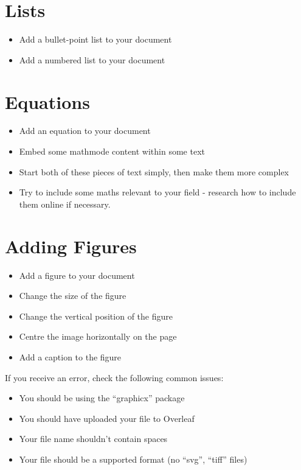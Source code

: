 \documentclass[11pt,a4paper]{article}
\begin{document}
\section{Lists}
\begin{itemize}
\item Add a bullet-point list to your document
\item Add a numbered list to your document
\end{itemize}

\section{Equations}
\begin{itemize}
\item Add an equation to your document
\item Embed some mathmode content within some text
\item Start both of these pieces of text simply, then make them more complex
\item Try to include some maths relevant to your field - research how to include them online if necessary.
\end{itemize}

\section{Adding Figures}
\begin{itemize}
\item Add a figure to your document
\item Change the size of the figure
\item Change the vertical position of the figure
\item Centre the image horizontally on the page
\item Add a caption to the figure
\end{itemize}

If you receive an error, check the following common issues:

\begin{itemize}
\item You should be using the ``graphicx'' package
\item You should have uploaded your file to Overleaf
\item Your file name shouldn't contain spaces
\item Your file should be a supported format (no ``svg'', ``tiff'' files)
\end{itemize}
\end{document}
